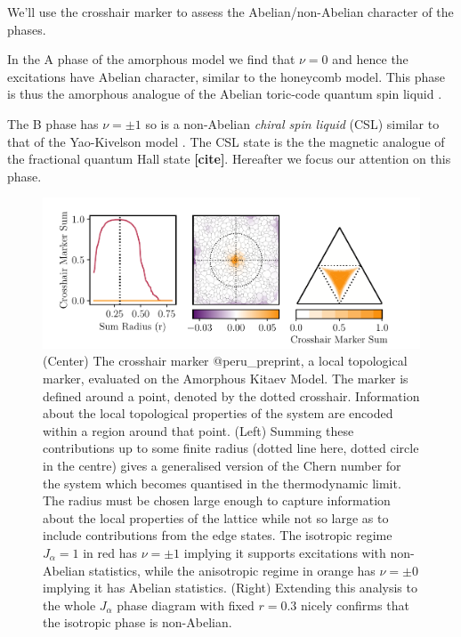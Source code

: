 We'll use the crosshair marker to assess the Abelian/non-Abelian character of the phases.

In the A phase of the amorphous model we find that \(\nu=0\) and hence the excitations have Abelian character, similar to the honeycomb model. This phase is thus the amorphous analogue of the Abelian toric-code quantum spin liquid \autocite{kitaev_fault-tolerant_2003}.

The B phase has \(\nu=\pm1\) so is a non-Abelian \emph{chiral spin liquid} (CSL) similar to that of the Yao-Kivelson model \autocite{yaoExactChiralSpin2007}. The CSL state is the the magnetic analogue of the fractional quantum Hall state \textbf{{[}cite{]}}. Hereafter we focus our attention on this phase.

\begin{figure}
\hypertarget{fig:phase_diagram_chern}{%
\centering
\includegraphics[width=1\textwidth,height=\textheight]{figure_code/amk_chapter/results/phase_diagram_chern/phase_diagram_chern}
\caption[Local Chern Markers]{(Center) The crosshair marker @peru\_preprint, a local
topological marker, evaluated on the Amorphous Kitaev Model. The marker
is defined around a point, denoted by the dotted crosshair. Information
about the local topological properties of the system are encoded within
a region around that point. (Left) Summing these contributions up to
some finite radius (dotted line here, dotted circle in the centre) gives
a generalised version of the Chern number for the system which becomes
quantised in the thermodynamic limit. The radius must be chosen large
enough to capture information about the local properties of the lattice
while not so large as to include contributions from the edge states. The
isotropic regime \(J_\alpha = 1\) in red has \(\nu = \pm 1\) implying it
supports excitations with non-Abelian statistics, while the anisotropic
regime in orange has \(\nu = \pm 0\) implying it has Abelian statistics.
(Right) Extending this analysis to the whole \(J_\alpha\) phase diagram
with fixed \(r = 0.3\) nicely confirms that the isotropic phase is
non-Abelian.}\label{fig:phase_diagram_chern}
}
\end{figure}

